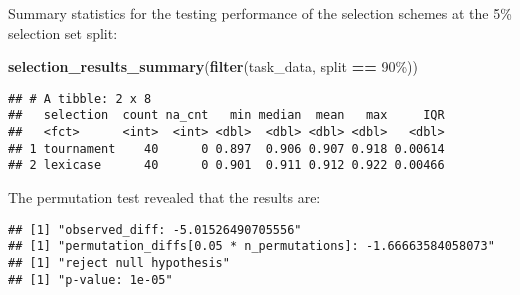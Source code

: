 \documentclass[
]{book}
\newenvironment{Shaded}{\begin{snugshade}}{\end{snugshade}}
\newcommand{\AttributeTok}[1]{\textcolor[rgb]{0.13,0.29,0.53}{#1}}
\newcommand{\DecValTok}[1]{\textcolor[rgb]{0.00,0.00,0.81}{#1}}
\newcommand{\FunctionTok}[1]{\textcolor[rgb]{0.13,0.29,0.53}{\textbf{#1}}}
\newcommand{\NormalTok}[1]{#1}
\newcommand{\OtherTok}[1]{\textcolor[rgb]{0.56,0.35,0.01}{#1}}
\newcommand{\SpecialCharTok}[1]{\textcolor[rgb]{0.81,0.36,0.00}{\textbf{#1}}}
\newcommand{\StringTok}[1]{\textcolor[rgb]{0.31,0.60,0.02}{#1}}
\begin{document}
Summary statistics for the testing performance of the selection schemes at the 5\% selection set split:

\begin{Shaded}
\begin{Highlighting}[]
\FunctionTok{selection\_results\_summary}\NormalTok{(}\FunctionTok{filter}\NormalTok{(task\_data, split }\SpecialCharTok{==} \StringTok{\textquotesingle{}90\%\textquotesingle{}}\NormalTok{))}
\end{Highlighting}
\end{Shaded}

\begin{verbatim}
## # A tibble: 2 x 8
##   selection  count na_cnt   min median  mean   max     IQR
##   <fct>      <int>  <int> <dbl>  <dbl> <dbl> <dbl>   <dbl>
## 1 tournament    40      0 0.897  0.906 0.907 0.918 0.00614
## 2 lexicase      40      0 0.901  0.911 0.912 0.922 0.00466
\end{verbatim}

The permutation test revealed that the results are:

\begin{Shaded}
\end{Shaded}

\begin{verbatim}
## [1] "observed_diff: -5.01526490705556"
## [1] "permutation_diffs[0.05 * n_permutations]: -1.66663584058073"
## [1] "reject null hypothesis"
## [1] "p-value: 1e-05"
\end{verbatim}
\end{document}
